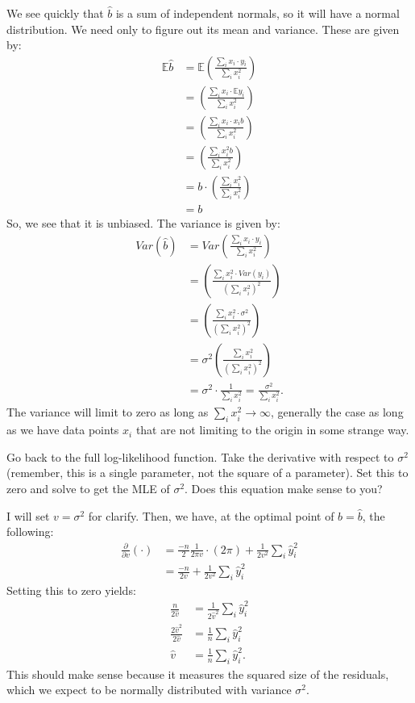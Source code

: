 We see quickly that $\widehat{b}$ is a sum of independent normals, so it will 
have a normal distribution. We need only to figure out its mean and variance.
These are given by:
\begin{align*}
\mathbb{E} \widehat{b} &= \mathbb{E} \left( \frac{\sum_i x_i \cdot y_i}{\sum_i x_i^2} \right) \\
&= \left( \frac{\sum_i x_i \cdot \mathbb{E} y_i}{\sum_i x_i^2} \right) \\
&= \left( \frac{\sum_i x_i \cdot x_i b}{\sum_i x_i^2} \right) \\
&= \left( \frac{\sum_i x_i^2 b}{\sum_i x_i^2} \right) \\
&= b \cdot \left( \frac{\sum_i x_i^2}{\sum_i x_i^2} \right) \\
&= b
\end{align*}
So, we see that it is unbiased. The variance is given by:
\begin{align*}
Var (\widehat{b}) &= Var \left( \frac{\sum_i x_i \cdot y_i}{\sum_i x_i^2} \right) \\
&= \left( \frac{\sum_i x_i^2 \cdot Var (y_i)}{\left(\sum_i x_i^2\right)^2} \right) \\
&= \left( \frac{\sum_i x_i^2 \cdot \sigma^2}{\left(\sum_i x_i^2\right)^2} \right) \\
&= \sigma^2 \left( \frac{\sum_i x_i^2}{\left(\sum_i x_i^2\right)^2} \right) \\
&= \sigma^2 \cdot  \frac{1}{\sum_i x_i^2} = \frac{\sigma^2}{\sum_i x_i^2}.
\end{align*}
The variance will limit to zero as long as $\sum_i x_i^2 \rightarrow \infty$,
generally the case as long as we have data points $x_i$ that are not limiting
to the origin in some strange way.


Go back to the full log-likelihood function. Take the derivative with respect
to $\sigma^2$ (remember, this is a single parameter, not the square of a parameter).
Set this to zero and solve to get the MLE of $\sigma^2$. Does this equation make
sense to you?


I will set $v = \sigma^2$ for clarify. Then, we have, at the optimal point of
$b = \widehat{b}$, the following:
\begin{align*}
\frac{\partial}{\partial v} (\cdot) &= \frac{-n}{2} \frac{1}{2\pi v} \cdot (2\pi) + \frac{1}{2v^2} \sum_i \widehat{y}_i^2 \\
&= \frac{-n}{2v} + \frac{1}{2v^2} \sum_i \widehat{y}_i^2
\end{align*}
Setting this to zero yields:
\begin{align*}
\frac{n}{2\widehat{v}} &= \frac{1}{2\widehat{v}^2} \sum_i \widehat{y}_i^2 \\
\frac{2\widehat{v}^2}{2\widehat{v}} &= \frac{1}{n} \sum_i \widehat{y}_i^2 \\
\widehat{v} &= \frac{1}{n} \sum_i \widehat{y}_i^2.
\end{align*}
This should make sense because it measures the squared size of the residuals,
which we expect to be normally distributed with variance $\sigma^2$.

